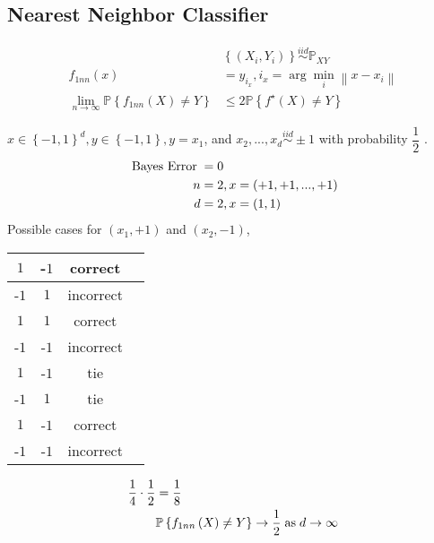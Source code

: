 \documentclass{article}
\begin{document}
\subsection{Nearest Neighbor Classifier}
\begin{align*}
&  \left\{\left(X_{i}, Y_{i}\right)\right\} \stackrel{iid}{\sim} \mathbb{P}_{XY}
\\ f_{1nn}\left(x\right) &= y_{i_{x}}, i_{x} = \arg\displaystyle\min_{i} \left\|x - x_{i}\right\|
\\ \lim_{n\to \infty} \mathbb{P}\left\{f_{1nn}\left(X\right) \neq  Y\right\} &\leq  2 \mathbb{P}\left\{f^\star \left(X\right) \neq  Y\right\}
\end{align*}
\begin{eg} \label{eg:zerobayes} 
$x \in \left\{-1, 1\right\}^{d}, y \in \left\{-1, 1\right\}, y  = x_{1}$, and $x_{2}, ..., x_{d} \stackrel{iid}{\sim} \pm 1$ with probability $\dfrac{1}{2}$ .
\begin{align*}
\text{\;Bayes Error\;} &= 0
\\ n  &= 2, x  = \left(+1, +1, ..., +1\right)
\\ d  &= 2, x  = \left(1, 1\right)
\end{align*}
Possible cases for $\left(x_{1}, +1\right)$ and $\left(x_{2}, -1\right)$,

\begin{center} \begin{tabular}{|c|c|c|c|}
\hline
 $1$ &-$1$ &correct\\ \hline
-$1$ &$1$ &incorrect\\ \hline
$1$ &$1$ &correct\\ \hline
-$1$ &-$1$ &incorrect\\ \hline
$1$ &-$1$ &tie\\ \hline
-$1$ &$1$ &tie\\ \hline
$1$ &-$1$ &correct\\ \hline
-$1$ &-$1$ &incorrect\\ \hline
\end{tabular} \end{center}
\begin{align*}
\dfrac{1}{4} \cdot  \dfrac{1}{2} &= \dfrac{1}{8}
\\ &  \mathbb{P}\left\{f_{1nn}\left(X\right) \neq  Y\right\} \to  \dfrac{1}{2} \text{\;as\;} d  \to  \infty
\end{align*}\end{eg}
\end{document}
